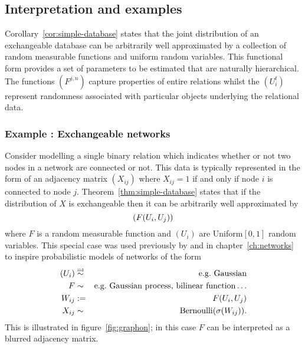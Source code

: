 \subsection{Interpretation and examples}

Corollary~\ref{cor:simple-database} states that the joint distribution of an exchangeable database can be arbitrarily well approximated by a collection of random measurable functions and uniform random variables.
This functional form provides a set of parameters to be estimated that are naturally hierarchical.
The functions $(F^{j,n})$ capture properties of entire relations whilst the $(U^t_i)$ represent randomness associated with particular objects underlying the relational data.

\subsubsection{Example : Exchangeable networks}

Consider modelling a single binary relation which indicates whether or not two nodes in a network are connected or not.
This data is typically represented in the form of an adjacency matrix $(X_{ij})$ where $X_{ij} = 1$ if and only if node $i$ is connected to node $j$.
Theorem~\ref{thm:simple-database} states that if the distribution of $X$ is exchangeable then it can be arbitrarily well approximated by
\begin{equation}
(F(U_i, U_j))
\end{equation}
where $F$ is a random measurable function and $(U_i)$ are \iid Uniform$[0,1]$ random variables\footnotemark{}.
This special case was used previously by \cite{Hoff2007-ja,Roy2009-ge,Lloyd2012-sb} and in chapter~\ref{ch:networks} to inspire probabilistic models of networks of the form
\begin{eqnarray}
(U_i) & \overset{\mbox{\tiny iid}}{\sim} & \textrm{e.g.\ Gaussian} \\
F & \sim & \textrm{e.g.\ Gaussian process, bilinear function}\ldots \\
W_{ij} & := & F(U_i, U_j) \\
X_{ij} & \sim & \textrm{Bernoulli}(\sigma(W_{ij}))\label{eq:graphon}.
\end{eqnarray}
This is illustrated in figure~\ref{fig:graphon}; in this case $F$ can be interpreted as a blurred adjacency matrix.


